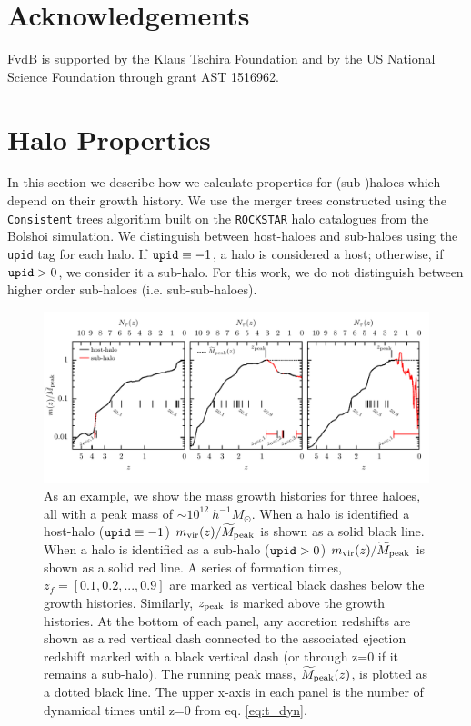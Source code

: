 \documentclass[a4paper,fleqn,usenatbib]{mnras}
\begin{document}
\section*{Acknowledgements}

FvdB is supported by the Klaus Tschira Foundation and by the US National Science Foundation through grant AST 1516962.

%

 

\appendix

\section{Halo Properties}
\label{sec:halo_properties}

In this section we describe how we calculate properties for (sub-)haloes which depend on their growth history.  We use the merger trees constructed using the {\tt Consistent} trees algorithm \citep{Behroozi:2013dz} built on the {\tt ROCKSTAR} halo catalogues from the Bolshoi simulation.  We distinguish between host-haloes and sub-haloes using the {\tt upid} tag for each halo.  If $ {\tt upid} \equiv -1$, a halo is considered a host; otherwise, if ${\tt upid} > 0$, we consider it a sub-halo.  For this work, we do not distinguish between higher order sub-haloes (i.e. sub-sub-haloes).

\begin{figure}
    \includegraphics{figures/growth_hist.pdf}
    \caption{As an example, we show the mass growth histories for three haloes, all with a peak mass of $\sim 10^{12}~h^{-1}M_{\odot}$.  When a halo is identified a host-halo (${\tt upid} \equiv -1$) $m_{\rm vir}(z)/\widetilde{M}_{\rm peak}$ is shown as a solid black line.  When a halo is identified as a sub-halo (${\tt upid} > 0$) $m_{\rm vir}(z)/\widetilde{M}_{\rm peak}$ is shown as a solid red line.  A series of formation times, $z_{f} = [0.1,0.2,...,0.9]$ are marked as vertical black dashes below the growth histories.  Similarly, $z_{\rm peak}$ is marked above the growth histories.  At the bottom of each panel, any accretion redshifts are shown as a red vertical dash connected to the associated ejection redshift marked with a black vertical dash (or through z=0 if it remains a sub-halo).  The running peak mass, $\widetilde{M}_{\rm peak}(z)$, is plotted as a dotted black line.  The upper x-axis in each panel is the number of dynamical times until z=0 from eq. \ref{eq:t_dyn}.}
    \label{fig:growth_hist}
\end{figure}
\end{document}
